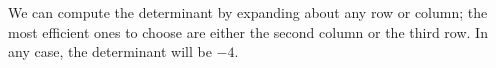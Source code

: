 %
We can compute the determinant by expanding about any row or column;  the most efficient ones to choose are either the second column or the third row.  In any case, the determinant will be $-4$.